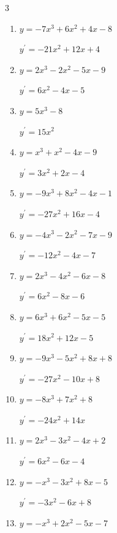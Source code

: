 \begin{multicols}{3}
\begin{enumerate}
        $\displaystyle y^{\prime}=-9x^{2}+8x-3$

  \item $y=-7x^{3}+6x^{2}+4x-8$

        $\displaystyle y^{\prime}=-21x^{2}+12x+4$

  \item $y=2x^{3}-2x^{2}-5x-9$

        $\displaystyle y^{\prime}=6x^{2}-4x-5$

  \item $y=5x^{3}-8$

        $\displaystyle y^{\prime}=15x^{2}$

\columnbreak %

  \item $y=x^{3}+x^{2}-4x-9$

        $\displaystyle y^{\prime}=3x^{2}+2x-4$

  \item $y=-9x^{3}+8x^{2}-4x-1$

        $\displaystyle y^{\prime}=-27x^{2}+16x-4$

  \item $y=-4x^{3}-2x^{2}-7x-9$

        $\displaystyle y^{\prime}=-12x^{2}-4x-7$

  \item $y=2x^{3}-4x^{2}-6x-8$

        $\displaystyle y^{\prime}=6x^{2}-8x-6$

  \item $y=6x^{3}+6x^{2}-5x-5$

        $\displaystyle y^{\prime}=18x^{2}+12x-5$

  \item $y=-9x^{3}-5x^{2}+8x+8$

        $\displaystyle y^{\prime}=-27x^{2}-10x+8$

  \item $y=-8x^{3}+7x^{2}+8$

        $\displaystyle y^{\prime}=-24x^{2}+14x$

  \item $y=2x^{3}-3x^{2}-4x+2$

        $\displaystyle y^{\prime}=6x^{2}-6x-4$

  \item $y=-x^{3}-3x^{2}+8x-5$

        $\displaystyle y^{\prime}=-3x^{2}-6x+8$

  \item $y=-x^{3}+2x^{2}-5x-7$


\end{enumerate}
\end{multicols}
